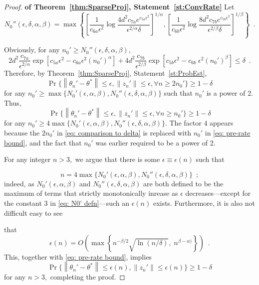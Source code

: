 \documentclass[usenames,dvipsnames,final,12pt]{colt2018} %
\newcommand{\st}{\alpha}
\newcommand{\thS}{\theta^*}
\newcommand{\sw}{\beta}
\newcommand{\norm}[1]{\left\lVert#1\right\rVert}
\newcommand{\gal}[1]{#1}
\newcommand{\gugan}[1]{#1}
\begin{document}
\begin{proof}\textbf{of Theorem~\ref{thm:SparseProj}, Statement~\ref{st:ConvRate}}
\gugan{Let
\[
N_0''(\epsilon,\delta,\st,\sw) =
\max \left\{ \left[\frac{1}{c_{6a} \epsilon^2} \log \frac{4d^2 c_{7a} e^{c_{5a}\epsilon^2}}{\epsilon^{2/\alpha} \delta}
\right]^{1/\st},
%
\left[\frac{1}{c_{6b} \epsilon^2} \log \frac{8d^2 c_{7b} e^{c_{5b}\epsilon^2}}{\epsilon^{2/\beta} \delta}
\right]^{1/\sw} \right\}  \enspace.
\]
}
Obviously, for any $n_0' \geq N_0''(\epsilon,\delta,\st,\sw)$,
%
\[
2d^2 \frac{c_{7a}}{\epsilon^{2/\alpha}} \exp\left[c_{5a} \epsilon^2 - c_{6a} \epsilon^2 (n_0')^\alpha \right] + 4d^2 \frac{c_{7b}}{\epsilon^{2/\beta}} \exp\left[c_{5b} \epsilon^2 - c_{6b} \; \epsilon^2 (n_0')^\beta \right] \leq \delta \enspace.
\]
%
Therefore, by Theorem~\ref{thm:SparseProj}, Statement~\ref{st:ProbEst},
\begin{equation}
\label{eq: comparison to delta}
\Pr\{\norm{\theta_n' - \thS} \leq \epsilon, \norm{z_n'} \leq \epsilon, \forall n \geq 2n_0'\} \geq 1-\delta
\end{equation}
for any $n_0' \geq \max\{N_0'(\epsilon,\st,\sw),N_0''(\epsilon,\delta,\st,\sw)\}$ \gal{such that $n_0'$ is a power of 2. Thus,}
\begin{equation}
\Pr\{\norm{\theta_n' - \thS} \leq \epsilon, \norm{z_n'} \leq \epsilon, \forall n \geq n_0'\}
\geq
1-\delta
\label{eq: pre-rate bound}
\end{equation}
for any $n_0' \geq 4\max\{N_0'(\epsilon,\st,\sw),N_0''(\epsilon,\delta,\st,\sw)\}$. \gal{The factor $4$ appears because the $2n_0'$ in \eqref{eq: comparison to delta} is replaced with $n_0'$ in \eqref{eq: pre-rate bound}, and the fact that $n_0'$ was earlier required to be a power of 2.}

{For any integer $n > 3,$ we argue that there is some $\epsilon \equiv \epsilon(n)$
such that
%
\gugan{
\[
n = 4\max\{N_0'(\epsilon,\st,\sw),N_0''(\epsilon,\delta,\st,\sw)\} \enspace;
\]}indeed, as $N_0'(\epsilon,\st,\sw)$ and $N_0''(\epsilon,\delta,\st, \sw)$ are both defined to be the maximum of terms that strictly monotonically inrease as $\epsilon$ decreases---except for the constant $3$ in \eqref{eq: N0' defn}---such an $\epsilon(n)$ exists. Furthermore, it is also not difficult easy to see} that
\begin{equation}
{ \epsilon(n) = O\left(\max\left\{n^{-\beta/2}\sqrt{{\ln (n/\delta)}},\; n^{\sw-\st)}\right\}\right) \enspace.}
\label{eq: order of magnitude of f}
\end{equation}
This, together with \eqref{eq: pre-rate bound}, implies
\begin{equation}
\Pr\{\norm{\theta_n' - \thS} \leq {\epsilon}(n), \norm{z_n'} \leq {\epsilon}(n)\}
\geq
1-\delta
\end{equation}
for any $n > 3,$ completing the proof.
\end{proof}
\end{document}
